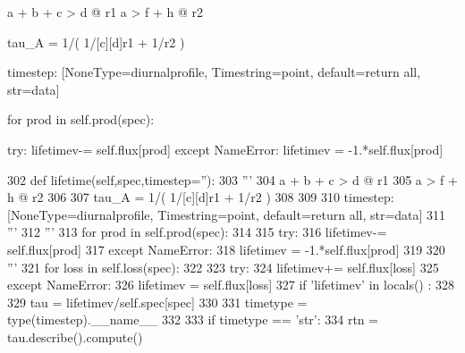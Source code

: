 \begin{DoxyVerb}a + b + c > d     @ r1
a         > f + h @ r2

tau_A = 1/(   1/[c][d]r1   + 1/r2      )


timestep: [NoneType=diurnalprofile, Timestring=point, default=return all, str=data]
\end{DoxyVerb}
\begin{DoxyVerb}for prod in self.prod(spec):

    try:
        lifetimev-= self.flux[prod]
    except NameError:
        lifetimev  = -1.*self.flux[prod]\end{DoxyVerb}
 
\begin{DoxyCode}
302     \textcolor{keyword}{def }lifetime(self,spec,timestep=''):
303             \textcolor{stringliteral}{'''}
304 \textcolor{stringliteral}{            a + b + c > d     @ r1}
305 \textcolor{stringliteral}{            a         > f + h @ r2}
306 \textcolor{stringliteral}{}
307 \textcolor{stringliteral}{            tau\_A = 1/(   1/[c][d]r1   + 1/r2      )}
308 \textcolor{stringliteral}{}
309 \textcolor{stringliteral}{}
310 \textcolor{stringliteral}{            timestep: [NoneType=diurnalprofile, Timestring=point, default=return all, str=data]}
311 \textcolor{stringliteral}{            '''}
312             \textcolor{stringliteral}{'''}
313 \textcolor{stringliteral}{            for prod in self.prod(spec):}
314 \textcolor{stringliteral}{}
315 \textcolor{stringliteral}{                            try:}
316 \textcolor{stringliteral}{                                lifetimev-= self.flux[prod]}
317 \textcolor{stringliteral}{                            except NameError:}
318 \textcolor{stringliteral}{                                lifetimev  = -1.*self.flux[prod]}
319 \textcolor{stringliteral}{}
320 \textcolor{stringliteral}{                                '''}
321             \textcolor{keywordflow}{for} loss \textcolor{keywordflow}{in} self.loss(spec):
322 
323                 \textcolor{keywordflow}{try}:
324                     lifetimev+= self.flux[loss]
325                 \textcolor{keywordflow}{except} NameError:
326                     lifetimev  = self.flux[loss]
327             \textcolor{keywordflow}{if} \textcolor{stringliteral}{'lifetimev'} \textcolor{keywordflow}{in} locals() :
328 
329                 tau = lifetimev/self.spec[spec]
330 
331                 timetype = type(timestep).\_\_name\_\_
332 
333                 \textcolor{keywordflow}{if} timetype == \textcolor{stringliteral}{'str'}:
334                     rtn = tau.describe().compute()

\end{DoxyCode}
